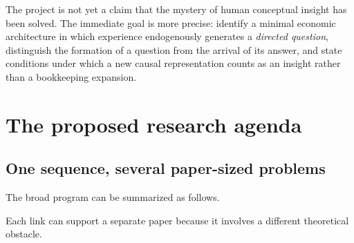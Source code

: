 \documentclass[11pt]{article}
\begin{document}
	The project is not yet a claim that the mystery of human conceptual insight has been solved.  The immediate goal is more precise: identify a minimal economic architecture in which experience endogenously generates a \emph{directed question}, distinguish the formation of a question from the arrival of its answer, and state conditions under which a new causal representation counts as an insight rather than a bookkeeping expansion.
	
	\section{The proposed research agenda}
	
	\subsection{One sequence, several paper-sized problems}
	
	The broad program can be summarized as follows.
	
	\begin{center}
	\end{center}
	
	Each link can support a separate paper because it involves a different theoretical obstacle.
	
\end{document}
